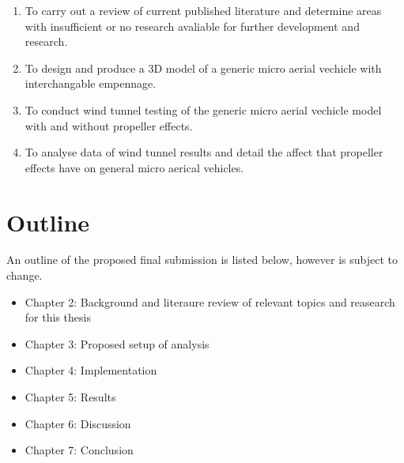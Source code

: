 \begin{enumerate}
  \item To carry out a review of current published literature and determine areas with insufficient or no research avaliable for further development and research.
  \item To design and produce a 3D model of a generic micro aerial vechicle with interchangable empennage.
  \item To conduct wind tunnel testing of the generic micro aerial vechicle model with and without propeller effects.
  \item To analyse data of wind tunnel results and detail the affect that propeller effects have on general micro aerical vehicles.
\end{enumerate}

\section{Outline}
\label{sec:Outline}
An outline of the proposed final submission is listed below, however is subject to change.

\begin{itemize}
  \item Chapter 2: Background and literaure review of relevant topics and reasearch for this thesis
  \item Chapter 3: Proposed setup of analysis
  \item Chapter 4: Implementation
  \item Chapter 5: Results
  \item Chapter 6: Discussion
  \item Chapter 7: Conclusion
\end{itemize}





